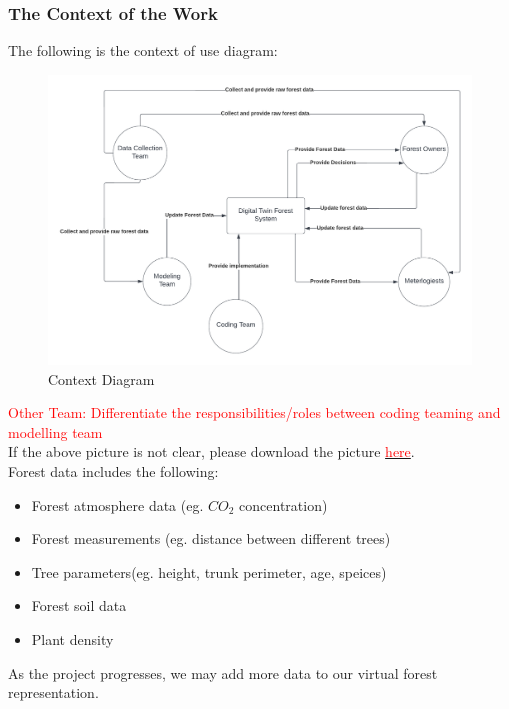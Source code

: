 \documentclass{article}
\begin{document}
\subsubsection{The Context of the Work}
The following is the context of use diagram:
\begin{figure}[H]
\begin{center}
\includegraphics[scale=0.7]{SRS_Pictures/Context_Use.png}
\end{center}
\caption{Context Diagram}
\end{figure}
\noindent \textcolor{red}{Other Team: Differentiate the responsibilities/roles between coding teaming
and modelling team}\\
\noindent If the above picture is not clear, please download the picture \href{https://github.com/wuj187/DigitalTwinCAS/blob/main/docs/SRS/SRS_Pictures/Context_Use.png}{\textcolor{red}{here}}. \\

\noindent Forest data includes the following:
\begin{itemize}
    \item Forest atmosphere data (eg. $CO_2$ concentration)
    \item Forest measurements (eg. distance between different trees)
    \item Tree parameters(eg. height, trunk perimeter, age, speices)
    \item Forest soil data
    \item Plant density
\end{itemize}
As the project progresses, we may add more data to our virtual forest representation.
\end{document}
